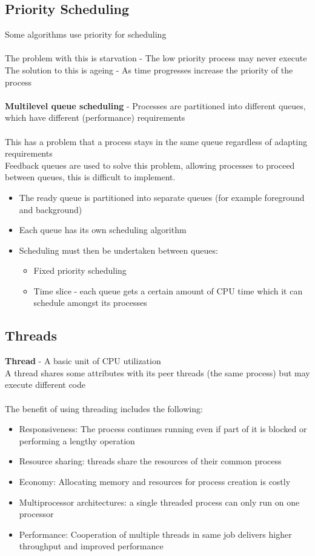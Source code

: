 \documentclass{article}[18pt]
\begin{document}
\subsection{Priority Scheduling}
Some algorithms use priority for scheduling\\
\\
The problem with this is starvation - The low priority process may never execute\\
The solution to this is ageing - As time progresses increase the priority of the process\\
\\
\textbf{Multilevel queue scheduling} - Processes are partitioned into different queues, which have different (performance) requirements\\
\\
This has a problem that a process stays in the same queue regardless of adapting requirements\\
Feedback queues are used to solve this problem, allowing processes to proceed between queues, this is difficult to implement.
\begin{itemize}
	\item The ready queue is partitioned into separate queues (for example foreground and background)
	\item Each queue has its own scheduling algorithm
	\item Scheduling must then be undertaken between queues:
	\begin{itemize}
		\item Fixed priority scheduling
		\item Time slice - each queue gets a certain amount of CPU time which it can schedule amongst its processes
	\end{itemize}
\end{itemize}
\subsection{Threads}
\textbf{Thread} - A basic unit of CPU utilization\\
A thread shares some attributes with its peer threads (the same process) but may execute different code\\
\\
The benefit of using threading includes the following:
\begin{itemize}
	\item Responsiveness: The process continues running even if part of it is blocked or performing a lengthy operation
	\item Resource sharing: threads share the resources of their common process
	\item Economy: Allocating memory and resources for process creation is costly
	\item Multiprocessor architectures: a single threaded process can only run on one processor
	\item Performance: Cooperation of multiple threads in same job delivers higher throughput and improved performance
\end{itemize}
\end{document}
